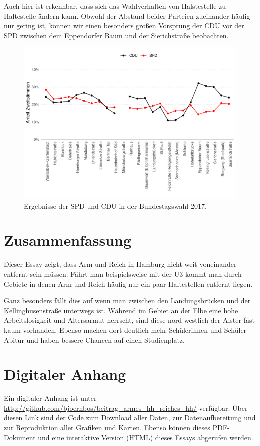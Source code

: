\documentclass[10pt,a4paper]{article}
\begin{document}
Auch hier ist erkennbar, dass sich das Wahlverhalten von Halstestelle zu Haltestelle ändern kann. Obwohl der Abstand beider Parteien zueinander häufig nur gering ist, können wir einen besonders großen Vorsprung der CDU vor der SPD zwischen dem Eppendorfer Baum und der Sierichstraße beobachten.

\begin{figure}[h!]
	\centering
	\caption{Ergebnisse der SPD und CDU in der Bundestagswahl 2017.}
	\label{fig:ergebnis_bundestagswahl_2017}
	\includegraphics[width=0.8\linewidth]{../../02_results/fig_ergebnis_bundestagswahl_2017.pdf}
\end{figure}


\section*{Zusammenfassung}
Dieser Essay zeigt, dass Arm und Reich in Hamburg nicht weit voneinander entfernt sein müssen. Fährt man beispielsweise mit der U3 kommt man durch Gebiete in denen Arm und Reich häufig nur ein paar Haltestellen entfernt liegen.

Ganz besonders fällt dies auf wenn man zwischen den Landungsbrücken und der Kellinghusenstraße unterwegs ist.  Während im Gebiet an der Elbe eine hohe Arbeitslosigkeit und Altersarmut herrscht, sind diese nord-westlich der Alster fast kaum vorhanden. Ebenso machen dort deutlich mehr Schülerinnen und Schüler Abitur und haben bessere Chancen auf einen Studienplatz.



\onehalfspacing



\section*{Digitaler Anhang }
Ein digitaler Anhang ist unter \url{http://github.com/bjoernbos/beitrag_armes_hh_reiches_hh/} verfügbar. Über diesen Link sind der Code zum Download aller Daten, zur Datenaufbereitung und zur Reproduktion aller Grafiken und Karten. Ebenso können dieses PDF-Dokument und eine \href{http://bjoernbos.github.com/beitrag_armes_hh_reiches_hh/}{interaktive Version (HTML)} dieses Essays abgerufen werden.
\end{document}
